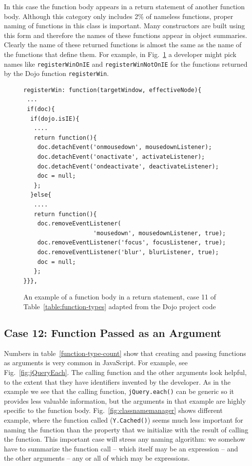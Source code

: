 \documentclass[10pt, preprint]{sigplanconf}
\begin{document}
In this case the function body appears in a return statement of another function body. Although this category only includes 2\% of nameless functions, proper naming of functions in this class is important. Many constructors are built using this form and therefore the names of these functions appear in object summaries.    Clearly the name of these returned functions is almost the same as the name of the functions that define them. For example, in Fig.~\ref{fig:registerWin} a developer might pick names like \verb|registerWinOnIE| and \verb|registerWinNotOnIE| for the functions returned by the Dojo function \verb|registerWin|.
\begin{figure}[htbp]

\lstset{basicstyle=\scriptsize}
\begin{lstlisting}[frame=single, language=myLang]
registerWin: function(targetWindow, effectiveNode){
 ...
 if(doc){
  if(dojo.isIE){
   ....
   return function(){
    doc.detachEvent('onmousedown', mousedownListener);
    doc.detachEvent('onactivate', activateListener);
    doc.detachEvent('ondeactivate', deactivateListener);
    doc = null;    
   };
  }else{
   ....
   return function(){
    doc.removeEventListener(
                    'mousedown', mousedownListener, true);
    doc.removeEventListener('focus', focusListener, true);
    doc.removeEventListener('blur', blurListener, true);
    doc = null;   
   };
}}},
\end{lstlisting}
\caption{An example of a function body in a return statement, case 11 of Table~\ref{table:function-types}  adapted from the Dojo project code}
\label{fig:registerWin}
\end{figure}

\subsection{Case 12: Function Passed as an Argument}
Numbers in table~\ref{function-type-count} show that creating and passing functions as arguments is very common in JavaScript.
For example, see Fig.~\ref{fig:jQueryEach}. The calling function and the other arguments look helpful, to the extent that they have identifiers invented by the developer. As in the example we see that the calling function, \verb|jQuery.each()| can be generic so it provides less valuable information, but the arguments in that example are highly specific to the function body.  Fig.~\ref{fig:classnamemanager} shows different example, where the function called (\verb|Y.Cached()|) seems much less important for naming the function than the property that we initialize with the result of calling the function.
This important case will stress any naming algorithm: we somehow have to summarize the function call -- which itself may be an expression -- and the other arguments -- any or all of which may be expressions. 
\end{document}

